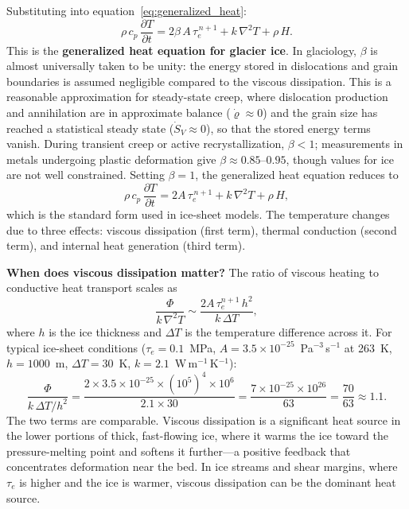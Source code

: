 \documentclass[11pt]{article}
\begin{document}
\medskip
\noindent Substituting into equation~\eqref{eq:generalized_heat}:
\begin{equation}
  \boxed{\rho\,c_p\,\frac{\partial T}{\partial t} = 2\beta\,A\,\tau_e^{\,n+1} + k\,\nabla^2 T + \rho\,H.}
  \label{eq:generalized_heat_glen}
\end{equation}
This is the \textbf{generalized heat equation for glacier ice}.  In glaciology, $\beta$ is almost universally taken to be unity: the energy stored in dislocations and grain boundaries is assumed negligible compared to the viscous dissipation.  This is a reasonable approximation for steady-state creep, where dislocation production and annihilation are in approximate balance ($\dot{\varrho} \approx 0$) and the grain size has reached a statistical steady state ($\dot{S}_V \approx 0$), so that the stored energy terms vanish.  During transient creep or active recrystallization, $\beta < 1$; measurements in metals undergoing plastic deformation give $\beta \approx 0.85$--$0.95$, though values for ice are not well constrained.  Setting $\beta = 1$, the generalized heat equation reduces to
\begin{equation}
  \rho\,c_p\,\frac{\partial T}{\partial t} = 2A\,\tau_e^{\,n+1} + k\,\nabla^2 T + \rho\,H,
  \label{eq:generalized_heat_beta1}
\end{equation}
which is the standard form used in ice-sheet models.  The temperature changes due to three effects: viscous dissipation (first term), thermal conduction (second term), and internal heat generation (third term).

\medskip
\noindent\textbf{When does viscous dissipation matter?}  The ratio of viscous heating to conductive heat transport scales as
\begin{equation}
  \frac{\Phi}{k\,\nabla^2 T} \sim \frac{2A\,\tau_e^{n+1}\,h^2}{k\,\Delta T},
\end{equation}
where $h$ is the ice thickness and $\Delta T$ is the temperature difference across it.  For typical ice-sheet conditions ($\tau_e = 0.1$~MPa, $A = 3.5 \times 10^{-25}$~Pa$^{-3}$\,s$^{-1}$ at 263~K, $h = 1000$~m, $\Delta T = 30$~K, $k = 2.1$~W\,m$^{-1}$\,K$^{-1}$):
\begin{equation}
  \frac{\Phi}{k\,\Delta T/h^2} = \frac{2 \times 3.5 \times 10^{-25} \times (10^5)^4 \times 10^6}{2.1 \times 30} = \frac{7 \times 10^{-25} \times 10^{26}}{63} = \frac{70}{63} \approx 1.1.
\end{equation}
The two terms are comparable.  Viscous dissipation is a significant heat source in the lower portions of thick, fast-flowing ice, where it warms the ice toward the pressure-melting point and softens it further---a positive feedback that concentrates deformation near the bed.  In ice streams and shear margins, where $\tau_e$ is higher and the ice is warmer, viscous dissipation can be the dominant heat source.
\end{document}
